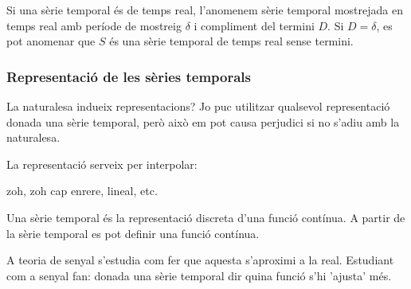 Si una sèrie temporal és de temps real, l'anomenem  sèrie temporal mostrejada
en temps real amb període de mostreig $\delta$ i compliment del termini $D$.
Si $D=\delta$, es pot anomenar que $S$ és una sèrie temporal de temps real sense termini.













\subsubsection{Representació de les sèries temporals}



La naturalesa indueix representacions?
Jo puc utilitzar qualsevol representació donada una sèrie temporal, però això em pot causa perjudici si no s'adiu amb la naturalesa.


La representació serveix per interpolar:

zoh, zoh cap enrere, lineal, etc.


Una sèrie temporal és la representació discreta d'una funció contínua. A partir de la sèrie temporal es pot definir una funció contínua. 

A teoria de senyal s'estudia com fer que aquesta s'aproximi a la real. Estudiant com a senyal fan: donada una sèrie temporal dir quina funció s'hi 'ajusta' més. 

